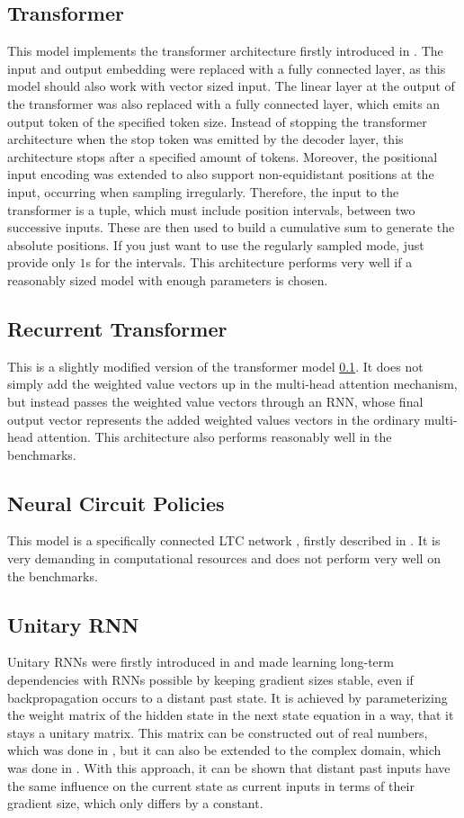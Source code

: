 \documentclass[draft,final]{vutinfth} %
\begin{document}
\subsection{Transformer} \label{Transformer}
This model implements the transformer architecture firstly introduced in \cite{Transformer}. The input and output embedding were replaced with a fully connected layer, as this model should also work with vector sized input. 
The linear layer at the output of the transformer was also replaced with a fully connected layer, which emits an output token of the specified token size.
Instead of stopping the transformer architecture when the stop token was emitted by the decoder layer, this architecture stops after a specified amount of tokens.
Moreover, the positional input encoding was extended to also support non-equidistant positions at the input, occurring when sampling irregularly.
Therefore, the input to the transformer is a tuple, which must include position intervals, between two successive inputs.
These are then used to build a cumulative sum to generate the absolute positions. If you just want to use the regularly sampled mode, just provide only $1$s for the intervals.
This architecture performs very well if a reasonably sized model with enough parameters is chosen.
\subsection{Recurrent Transformer} \label{Recurrent Transformer}
This is a slightly modified version of the transformer model \ref{Transformer}. 
It does not simply add the weighted value vectors up in the multi-head attention mechanism, but instead passes the weighted value vectors through an RNN, whose final output vector represents the added weighted values vectors in the ordinary multi-head attention.
This architecture also performs reasonably well in the benchmarks.
\subsection{Neural Circuit Policies} \label{Neural Circuit Policies}
This model is a specifically connected LTC network \cite{LTCNetworks}, firstly described in \cite{NCP}.
It is very demanding in computational resources and does not perform very well on the benchmarks.
\subsection{Unitary RNN} \label{Unitary RNN}
Unitary RNNs were firstly introduced in \cite{UnitaryRNNs} and made learning long-term dependencies with RNNs possible by keeping gradient sizes stable, even if backpropagation occurs to a distant past state. 
It is achieved by parameterizing the weight matrix of the hidden state in the next state equation in a way, that it stays a unitary matrix. 
This matrix can be constructed out of real numbers, which was done in \cite{UnitaryRNNs}, but it can also be extended to the complex domain, which was done in \cite{EfficientUnitaryRNNs}.
With this approach, it can be shown that distant past inputs have the same influence on the current state as current inputs in terms of their gradient size, which only differs by a constant.
\end{document}

